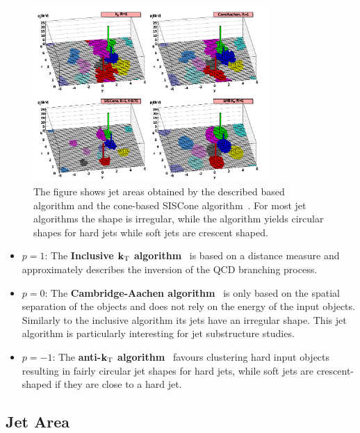 \begin{figure}[htb]
    \centering
    \includegraphics[width=0.8\textwidth]{figures/jet_reconstruction/jet_shapes.pdf}
    \caption[Jet areas of various jet algorithms]{The figure shows jet areas obtained by the described \kt based algorithm
        and the cone-based SISCone algorithm~\cite{Salam:2009jx}. For most jet
        algorithms the shape is irregular, while the \antikt algorithm yields
        circular shapes for hard jets while soft jets are crescent shaped.}
    \label{fig:jet_shapes}
\end{figure}

\begin{itemize}
    \item $p=1$: The \textbf{Inclusive $\mathbf{k_{\mathrm{T}}}$
    algorithm}~\cite{Catani:1991hj,Catani:1992rm} is based on a \ptsq
        distance measure and approximately describes the inversion
        of the QCD branching process.
    \item $p=0$: The \textbf{Cambridge-Aachen
        algorithm}~\cite{Dokshitzer:1997in} is only based on the
        spatial separation of the objects and does not rely on the energy of
        the input objects. Similarly to the inclusive \kt algorithm its jets
        have an irregular shape. This jet algorithm is particularly interesting
        for jet substructure studies.
    \item  $p=-1$: The \textbf{anti-$\mathbf{k_{\mathrm{T}}}$ algorithm}~\cite{Cacciari:2008gp} favours clustering hard input
        objects resulting in fairly circular jet shapes for hard jets, while
        soft jets are crescent-shaped if they are close to a hard jet.
\end{itemize}

\subsection{Jet Area}

